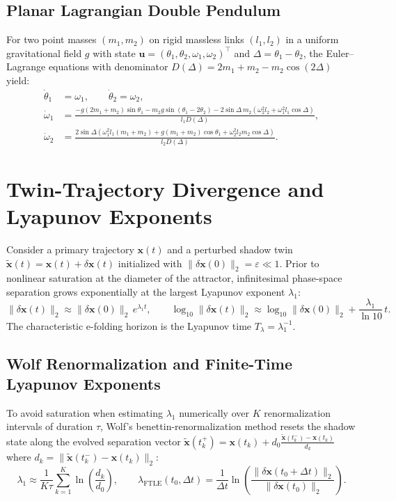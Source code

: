\documentclass{article}
\begin{document}
\subsection{Planar Lagrangian Double Pendulum}
For two point masses $(m_1, m_2)$ on rigid massless links $(l_1, l_2)$ in a uniform gravitational field $g$ with state $\mathbf{u} = (\theta_1, \theta_2, \omega_1, \omega_2)^\top$ and $\Delta = \theta_1 - \theta_2$, the Euler--Lagrange equations with denominator $D(\Delta) = 2m_1 + m_2 - m_2 \cos(2\Delta)$ yield:
\begin{align}
\dot{\theta}_1 &= \omega_1, \qquad \dot{\theta}_2 = \omega_2, \\
\dot{\omega}_1 &= \frac{-g(2m_1 + m_2)\sin\theta_1 - m_2 g \sin(\theta_1 - 2\theta_2) - 2\sin\Delta\, m_2\left(\omega_2^2 l_2 + \omega_1^2 l_1 \cos\Delta\right)}{l_1 D(\Delta)}, \\
\dot{\omega}_2 &= \frac{2\sin\Delta\left(\omega_1^2 l_1(m_1 + m_2) + g(m_1 + m_2)\cos\theta_1 + \omega_2^2 l_2 m_2 \cos\Delta\right)}{l_2 D(\Delta)}.
\end{align}

\section{Twin-Trajectory Divergence and Lyapunov Exponents}

Consider a primary trajectory $\mathbf{x}(t)$ and a perturbed shadow twin $\tilde{\mathbf{x}}(t) = \mathbf{x}(t) + \delta\mathbf{x}(t)$ initialized with $\|\delta\mathbf{x}(0)\|_2 = \varepsilon \ll 1$. Prior to nonlinear saturation at the diameter of the attractor, infinitesimal phase-space separation grows exponentially at the largest Lyapunov exponent $\lambda_1$:
\begin{equation}
\|\delta\mathbf{x}(t)\|_2 \approx \|\delta\mathbf{x}(0)\|_2 \, e^{\lambda_1 t}, \qquad
\log_{10}\|\delta\mathbf{x}(t)\|_2 \approx \log_{10}\|\delta\mathbf{x}(0)\|_2 + \frac{\lambda_1}{\ln 10}\, t.
\end{equation}
The characteristic e-folding horizon is the Lyapunov time $T_\lambda = \lambda_1^{-1}$.

\subsection{Wolf Renormalization and Finite-Time Lyapunov Exponents}
To avoid saturation when estimating $\lambda_1$ numerically over $K$ renormalization intervals of duration $\tau$, Wolf's benettin-renormalization method resets the shadow state along the evolved separation vector $\tilde{\mathbf{x}}(t_k^+) = \mathbf{x}(t_k) + d_0 \frac{\tilde{\mathbf{x}}(t_k^-) - \mathbf{x}(t_k)}{d_k}$ where $d_k = \|\tilde{\mathbf{x}}(t_k^-) - \mathbf{x}(t_k)\|_2$:
\begin{equation}
\lambda_1 \approx \frac{1}{K \tau} \sum_{k=1}^{K} \ln\!\left(\frac{d_k}{d_0}\right), \qquad
\lambda_{\mathrm{FTLE}}(t_0, \Delta t) = \frac{1}{\Delta t} \ln\!\left(\frac{\|\delta\mathbf{x}(t_0 + \Delta t)\|_2}{\|\delta\mathbf{x}(t_0)\|_2}\right).
\end{equation}
\end{document}
